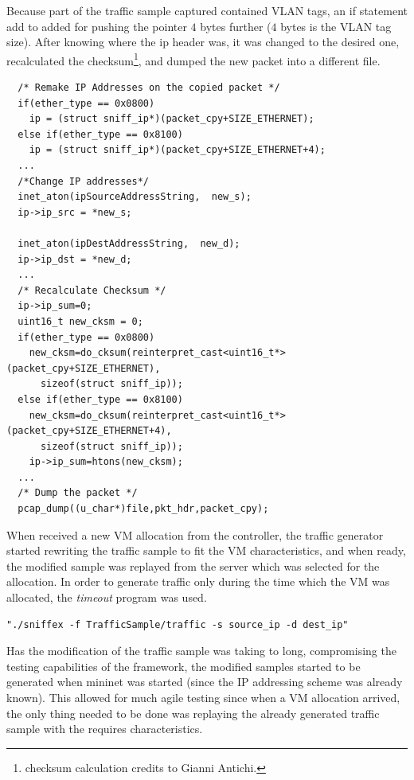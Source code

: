 \documentclass[12pt,english,oneside]{book}
\begin{document}
Because part of the traffic sample captured contained VLAN tags, an if statement add to added for pushing the pointer $4$ bytes further ($4$ bytes is the VLAN tag size).
After knowing where the ip header was, it was changed to the desired one, recalculated the checksum\footnote{checksum calculation credits to Gianni Antichi.}, and dumped the new packet into a different file.

\begin{lstlisting}
  /* Remake IP Addresses on the copied packet */
  if(ether_type == 0x0800)
    ip = (struct sniff_ip*)(packet_cpy+SIZE_ETHERNET);
  else if(ether_type == 0x8100)
    ip = (struct sniff_ip*)(packet_cpy+SIZE_ETHERNET+4);
  ...
  /*Change IP addresses*/
  inet_aton(ipSourceAddressString,  new_s);
  ip->ip_src = *new_s;
  
  inet_aton(ipDestAddressString,  new_d);
  ip->ip_dst = *new_d;
  ...
  /* Recalculate Checksum */
  ip->ip_sum=0;
  uint16_t new_cksm = 0;
  if(ether_type == 0x0800)
    new_cksm=do_cksum(reinterpret_cast<uint16_t*>(packet_cpy+SIZE_ETHERNET),
      sizeof(struct sniff_ip));
  else if(ether_type == 0x8100)
    new_cksm=do_cksum(reinterpret_cast<uint16_t*>(packet_cpy+SIZE_ETHERNET+4),
      sizeof(struct sniff_ip));
    ip->ip_sum=htons(new_cksm);
  ...
  /* Dump the packet */    
  pcap_dump((u_char*)file,pkt_hdr,packet_cpy);

\end{lstlisting}

When received a new VM allocation from the controller, the traffic generator started rewriting the traffic sample to fit the VM characteristics, and when ready, the modified sample was replayed from the server which was selected for the allocation. In order to generate traffic only during the time which the VM was allocated, the \textit{timeout} program was used.

\begin{verbatim}
"./sniffex -f TrafficSample/traffic -s source_ip -d dest_ip"
\end{verbatim}

Has the modification of the traffic sample was taking to long, compromising the testing capabilities of the framework, the modified samples started to be generated when mininet was started (since the IP addressing scheme was already known). This allowed for much agile testing since when a VM allocation arrived, the only thing needed to be done was replaying the already generated traffic sample with the requires characteristics.
\end{document}
